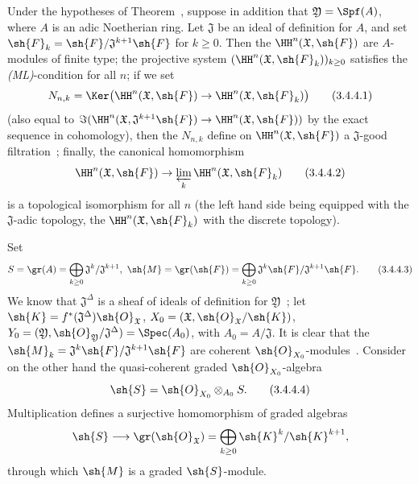 \begin{corollary}[3.4.4]
\label{III.3.4.4}
Under the hypotheses of Theorem~, suppose in addition that $\mathfrak{Y}=\Spf(A)$, where $A$ is an adic Noetherian ring.
Let $\mathfrak{J}$ be an ideal of definition for $A$, and set $\sh{F}_k=\sh{F}/\mathfrak{J}^{k+1}\sh{F}$ for $k\geq 0$.
Then the $\HH^n(\mathfrak{X},\sh{F})$ are $A$-modules of finite type; the projective system $(\HH^n(\mathfrak{X},\sh{F}_k))_{k\geq 0}$ satisfies the \emph{(ML)}-condition for all $n$; if we set
\[
\label{III.3.4.4.1}
  N_{n,k}=\Ker\big(\HH^n(\mathfrak{X},\sh{F})\to\HH^n(\mathfrak{X},\sh{F}_k)\big)
  \tag{3.4.4.1}
\]
(also equal to $\Im(\HH^n(\mathfrak{X},\mathfrak{J}^{k+1}\sh{F})\to\HH^n(\mathfrak{X},\sh{F}))$ by the exact sequence in cohomology), then the $N_{n,k}$ define on $\HH^n(\mathfrak{X},\sh{F})$ a $\mathfrak{J}$-good filtration~; finally, the canonical homomorphism
\[
\label{III.3.4.4.2}
  \HH^n(\mathfrak{X},\sh{F})\to\varprojlim_k\HH^n(\mathfrak{X},\sh{F}_k)
  \tag{3.4.4.2}
\]
is a topological isomorphism for all $n$ (the left hand side being equipped with the $\mathfrak{J}$-adic topology, the $\HH^n(\mathfrak{X},\sh{F}_k)$ with the discrete topology).
\end{corollary}

Set
\[
\label{III.3.4.4.3}
  S=\gr(A)=\bigoplus_{k\geq 0}\mathfrak{J}^k/\mathfrak{J}^{k+1},\ \sh{M}=\gr(\sh{F})=\bigoplus_{k\geq 0}\mathfrak{J}^k\sh{F}/\mathfrak{J}^{k+1}\sh{F}. \tag{3.4.4.3}
\]
We know that $\mathfrak{J}^\Delta$ is a sheaf of ideals of definition for $\mathfrak{Y}$~; let $\sh{K}=f^*(\mathfrak{J}^\Delta)\sh{O}_\mathfrak{X}$, $X_0=(\mathfrak{X},\sh{O}_\mathfrak{X}/\sh{K})$, $Y_0=(\mathfrak{Y},\sh{O}_\mathfrak{Y}/\mathfrak{J}^\Delta)=\Spec(A_0)$, with $A_0=A/\mathfrak{J}$.
It is clear that the $\sh{M}_k=\mathfrak{J}^k\sh{F}/\mathfrak{J}^{k+1}\sh{F}$ are coherent $\sh{O}_{X_0}$-modules~.
Consider on the other hand the quasi-coherent graded $\sh{O}_{X_0}$-algebra
\[
\label{III.3.4.4.4}
  \sh{S}=\sh{O}_{X_0}\otimes_{A_0}S.
  \tag{3.4.4.4}
\]
Multiplication defines a surjective homomorphism of graded algebras
\[
  \sh{S}\longrightarrow\gr(\sh{O}_\mathfrak{X})
  =\bigoplus_{k\geq 0}\sh{K}^k/\sh{K}^{k+1},
\]
through which $\sh{M}$ is a graded $\sh{S}$-module.

